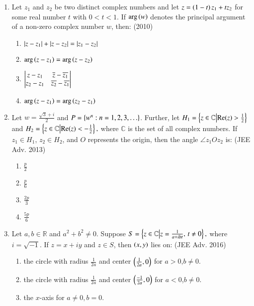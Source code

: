 \documentclass[journal]{IEEEtran}
\begin{document}
\begin{enumerate}
\begin{multicols}{4}
\begin{enumerate}
    \end{enumerate}
\end{multicols}
    \item Let $z_1$ and $z_2$ be two distinct complex numbers and let $z= \left(1-t\right)z_1+tz_2$ for some real number $t$ with $0<t<1$. If $\mathrm{arg}\left(w\right)$ denotes the principal argument of a non-zero complex number $w$, then: \hfill (2010)
\begin{enumerate}
    \item $\left\vert z-z_1\right\vert+\left\vert z-z_2\right\vert=\left\vert z_1-z_2\right\vert$
    \item $\mathrm{arg}\left(z-z_1\right)=\mathrm{arg}\left(z-z_2\right)$
    \item $\begin{vmatrix}z-z_1 & \overline{z}-\overline{z_1} \\z_2-z_1 & \overline{z_2}-\overline{z_1}\end{vmatrix}$
    \item $\mathrm{arg}\left(z-z_1\right)=\mathrm{arg}\left(z_2-z_1\right)$
\end{enumerate}
\item Let $w=\frac{\sqrt{3}+i}{2}$ and $P=\left\{w^n:n=1,2,3,\ldots\right\}$. Further, let $H_1=\left\{z \in \mathbb{C} \middle|\mathrm{Re}(z) > \frac{1}{2}\right\}$ and $H_2=\left\{ z \in \mathbb{C}\middle|\mathrm{Re}(z) < -\frac{1}{2}\right\},$
where $\mathbb{C}$ is the set of all complex numbers. If $z_1 \in H_1$, $z_2 \in H_2$, and $O$ represents the origin, then the angle $\angle z_1Oz_2$ is: \hfill (JEE Adv. 2013)
\begin{multicols}{4}
    \begin{enumerate}
    \item $\frac{p}{2}$
    \item $\frac{p}{6}$
    \item $\frac{2p}{3}$
    \item $\frac{5p}{6}$
    \end{enumerate}
\end{multicols}
\item Let $a,b \in \mathbb{R}$ and $a^2+b^2 \ne 0$. Suppose $S=\left\{ z \in \mathbb{C}\middle|z = \frac{1}{a + ibt}, \, t \ne 0\right\},$
    where $i=\sqrt{-1}$. If $z=x+iy$ and $z \in S$, then $\left(x,y\right)$ lies on: \hfill (JEE Adv. 2016)
    \begin{enumerate}
    \item the circle with radius $\frac{1}{2a}$ and center $\left(\frac{1}{2a},0\right)$ for $a>0$,$b \ne 0$.
    \item the circle with radius $\frac{1}{2a}$ and center $\left(\frac{-1}{2a}, 0\right)$ for $a<0$,$b \ne 0$.
    \item the $x$-axis for $a \ne 0 ,b=0$.

\end{enumerate}
\end{enumerate}
\end{document}
